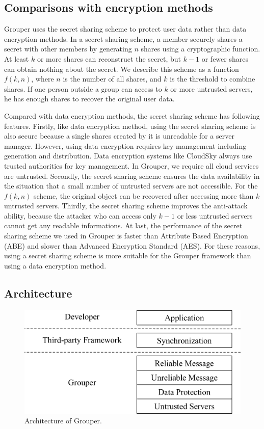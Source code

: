 \documentclass[twocolumn,10pt]{article}
\begin{document}
\subsection{Comparisons with encryption methods}

Grouper uses the secret sharing scheme to protect user data rather than data encryption methods.
In a secret sharing scheme, a member securely shares a secret with other members by generating $n$ shares using a cryptographic function\cite{smith2013layered}. 
At least $k$ or more shares can reconstruct the secret, but $k-1$ or fewer shares can obtain nothing about the secret\cite{pang2005new}. 
We describe this scheme as a function $f(k, n)$, where $n$ is the number of all shares, and $k$ is the threshold to combine shares. 
If one person outside a group can access to $k$ or more untrusted servers, he has enough shares to recover the original user data.

Compared with data encryption methods, the secret sharing scheme has following features.
Firstly, like data encryption method, using the secret sharing scheme is also secure because a single shares created by it is unreadable for a server manager.
However, using data encryption requires key management including generation and distribution.
Data encryption systems like CloudSky always use trusted authorities for key management.
In Grouper, we require all cloud services are untrusted.
Secondly, the secret sharing scheme ensures the data availability in the situation that a small number of untrusted servers are not accessible.
For the $f(k, n)$ scheme, the original object can be recovered after accessing more than $k$ untrusted servers.
Thirdly, the secret sharing scheme improves the anti-attack ability, because the attacker who can access only $k-1$ or less untrusted servers cannot get any readable informations.
At last, the performance of the secret sharing scheme we used in Grouper is faster than Attribute Based Encryption (ABE) and slower than Advanced Encryption Standard (AES).
For these reasons, using a secret sharing scheme is more suitable for the Grouper framework than using a data encryption method.

\subsection{Architecture}

\begin{figure}[t]
	\centering
	\includegraphics[scale=0.45]{architecture}
	\caption{Architecture of Grouper.}
\end{figure}
\end{document}
